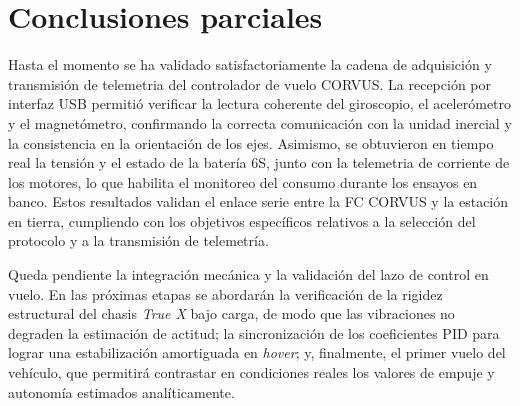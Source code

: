 \documentclass[12pt, letterpaper]{report}
\begin{document}
\section{Conclusiones parciales}

Hasta el momento se ha validado satisfactoriamente la cadena de adquisición y 
transmisión de telemetria del controlador de vuelo CORVUS. La recepción por 
interfaz USB permitió verificar la lectura coherente del giroscopio, el 
acelerómetro y el magnetómetro, confirmando la correcta comunicación con la 
unidad inercial y la consistencia en la orientación de los ejes. Asimismo, se 
obtuvieron en tiempo real la tensión y el estado de la batería 6S, junto con la 
telemetria de corriente de los motores, lo que habilita el monitoreo del consumo 
durante los ensayos en banco. Estos resultados validan el enlace serie entre la 
FC CORVUS y la estación en tierra, cumpliendo con los objetivos específicos 
relativos a la selección del protocolo y a la transmisión de telemetría.

Queda pendiente la integración mecánica y la validación del lazo de control en 
vuelo. En las próximas etapas se abordarán la verificación de la rigidez 
estructural del chasis \textit{True X} bajo carga, de modo que las vibraciones 
no degraden la estimación de actitud; la sincronización de los coeficientes PID 
para lograr una estabilización amortiguada en \textit{hover}; y, finalmente, el 
primer vuelo del vehículo, que permitirá contrastar en condiciones reales los 
valores de empuje y autonomía estimados analíticamente.
\end{document}
